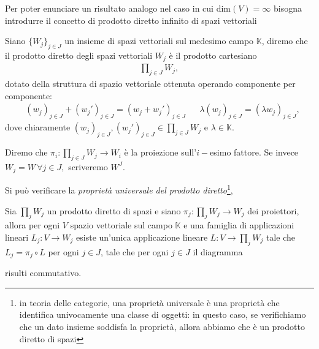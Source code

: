 Per poter enunciare un risultato analogo nel caso in cui $\text{dim}(V) = \infty$ bisogna introdurre il concetto di prodotto diretto infinito di spazi vettoriali
\begin{definition}
    Siano $\{ W_j \}_{j \in J}$ un insieme di spazi vettoriali sul medesimo campo $\mathbb{K}$, diremo che il prodotto diretto degli spazi vettoriali $W_j$ è il prodotto cartesiano
    \begin{align}
        \prod_{j \in J} W_j,
    \end{align}
    dotato della struttura di spazio vettoriale ottenuta operando componente per componente:
    \begin{align}
        &(w_j)_{j \in J} + (w_j')_{j \in J} = (w_j + w_j')_{j \in J} & &\lambda(w_j)_{j \in J} = (\lambda w_j)_{j \in J},
    \end{align}
    dove chiaramente $(w_j)_{j \in J}, (w_j')_{j \in J} \in \prod_{j \in J} W_j$ e $\lambda \in \mathbb{K}$. 
\end{definition}
\begin{definition}[proiettore]
    Diremo che $\pi_i : \prod_{j \in J} W_j \to W_i$ è la proiezione sull'$i-$esimo fattore. Se invece $W_j = W \, \forall j \in J,$ scriveremo $W^J$. 
\end{definition}
Si può verificare la \emph{proprietà universale del prodotto diretto}\footnote{in teoria delle categorie, una proprietà universale è una proprietà che identifica univocamente una classe di oggetti: in questo caso, se verifichiamo che un dato insieme soddisfa la proprietà, allora abbiamo che è un prodotto diretto di spazi},
\begin{prop}
    Sia $\prod_j W_j$ un prodotto diretto di spazi e siano $\pi_j : \prod_j W_j \to W_j$ dei proiettori, allora per ogni $V$ spazio vettoriale sul campo $\mathbb{K}$ e una famiglia di applicazioni lineari $L_j: V \to W_j$ esiste un'unica applicazione lineare $L: V \to \prod_j W_j$ tale che $L_j = \pi_j \circ L$ per ogni $j \in J$, tale che per ogni $j \in J$ il diagramma
    \begin{figure}[H]
        \centering
    \end{figure}
    risulti commutativo. 
\end{prop} 
